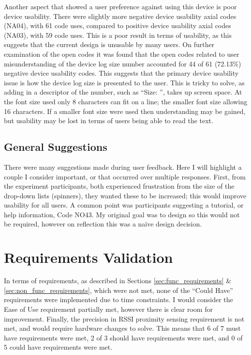 \documentclass{l4proj}
\begin{document}
Another aspect that showed a user preference against using this device is poor device usability. There were slightly more negative device usability axial codes (NA04), with 61 code uses, compared to positive device usability axial codes (NA03), with 59 code uses. This is a poor result in terms of usability, as this suggests that the current design is unusable by many users. On further examination of the open codes it was found that the open codes related to user misunderstanding of the device log size number accounted for 44 of 61 (72.13\%) negative device usability codes. This suggests that the primary device usability issue is how the device log size is presented to the user. This is tricky to solve, as adding in a descriptor of the number, such as “Size: ”, takes up screen space. At the font size used only 8 characters can fit on a line; the smaller font size allowing 16 characters. If a smaller font size were used then understanding may be gained, but usability may be lost in terms of users being able to read the text.

\subsection{General Suggestions}

There were many suggestions made during user feedback. Here I will highlight a couple I consider important, or that occurred over multiple responses. First, from the experiment participants, both experienced frustration from the size of the drop-down lists (spinners), they wanted these to be increased; this would improve usability for all users. A common point was participants suggesting a tutorial, or help information, Code NO43. My original goal was to design so this would not be required, however on reflection this was a naïve design decision.

\section{Requirements Validation}

In terms of requirements, as described in Sections \ref{sec:func_requirements} \& \ref{sec:non_func_requirements}, which were not met, none of the “Could Have” requirements were implemented due to time constraints. I would consider the Ease of Use requirement partially met, however there is clear room for improvement. Finally, the precision in RSSI proximity sensing requirement is not met, and would require hardware changes to solve. This means that 6 of 7 must have requirements were met, 2 of 3 should have requirements were met, and 0 of 5 could have requirements were met.
\end{document}
